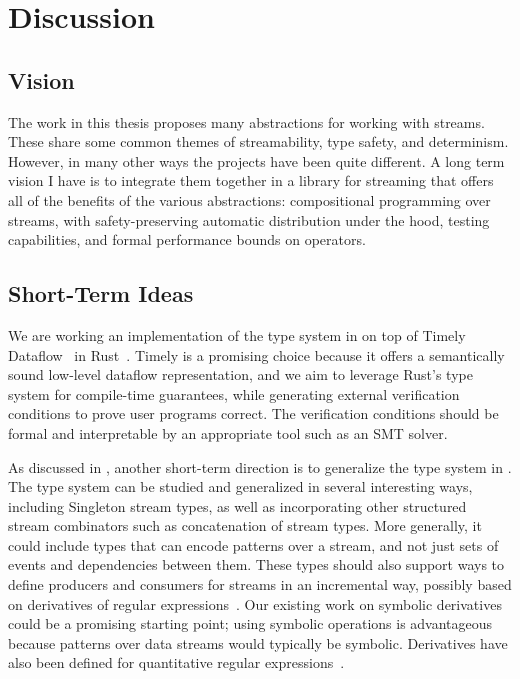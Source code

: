\chapter{Discussion}
\label{cha:discussion}


\section{Vision}

The work in this thesis proposes many abstractions for working with streams. These share some common themes of streamability, type safety, and determinism.
However, in many other ways the projects have been quite different.
A long term vision I have is to integrate them together in a library for streaming that offers all of the benefits of the various abstractions:
compositional programming over streams, with safety-preserving automatic distribution under the hood, testing capabilities, and formal performance bounds on operators.

\section{Short-Term Ideas}

We are working an implementation of the type system in  on top of Timely Dataflow~\cite{Timely,Naiad2013} in Rust~\cite{RustLang}.
Timely is a promising choice because it offers a semantically sound low-level dataflow representation,
and we aim to leverage Rust's type system for compile-time guarantees,
while generating external verification conditions to prove user programs correct.
The verification conditions should be formal and interpretable by an appropriate tool such as an SMT solver.

As discussed in , another short-term direction is to generalize the type system in .
The type system can be studied and generalized in several interesting ways, including Singleton stream types, as well as incorporating other structured stream combinators such as concatenation of stream types.
More generally, it could include types that can encode patterns over a stream, and not just sets of events and dependencies between them.
These types should also support ways to define producers and consumers for streams in an incremental way,
possibly based on derivatives of regular expressions~\cite{brzozowski1964derivatives,antimirov1996partial}.
Our existing work on symbolic derivatives~ could be a promising starting point; using symbolic operations is advantageous because patterns over data streams would typically be symbolic.
Derivatives have also been defined for quantitative regular expressions~\cite{alur2017derivatives}.

